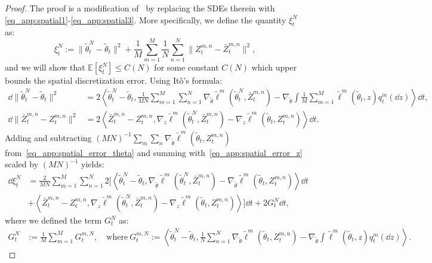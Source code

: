 \begin{proof}
    The proof is a modification of~\citet[Lemma 13]{caprioerrorboundsparticle2024} by replacing the SDEs therein with \eqref{eq_app:spatial1}-\eqref{eq_app:spatial3}. More specifically, we define the quantity $\xi^N_t$ as:
    \begin{equation}
        \xi_t^N := \|\tilde\theta_t^N - \tilde\theta_t\|^2 + \frac1M \sum_{m=1}^M \frac1N \sum_{n=1}^N \|Z_t^{m,n} - \bar{Z}_t^{m,n}\|^2,
    \end{equation}
    and we will show that $\mathbb{E}[\xi_t^N] \leq C(N)$ for some constant $C(N)$ which upper bounds the spatial discretization error. Using Itô's formula:
    \begin{align}
        \dd \|\tilde\theta_t^N - \tilde\theta_t\|^2 &= 2 \left\langle \tilde\theta_t^N - \tilde\theta_t, \frac{1}{MN} \sum_{m=1}^{M} \sum_{n=1}^N \nabla_{\tilde\theta} \tilde{\ell}^m(\tilde\theta_t^N, \bar{Z}_t^{m,n}) - \nabla_{\tilde\theta} \int \frac1M \sum_{m=1}^M \tilde{\ell}^m(\tilde\theta_t, z) q_t^m(\dd z) \right\rangle \dd t, \label{eq_app:spatial_error_theta}\\
        \dd \|\bar{Z}_t^{m,n} - {Z}_t^{m,n}\|^2 &= 2 \left\langle  
            \bar{Z}_t^{m,n} - {Z}_t^{m,n}, \nabla_z \tilde{\ell}^m(\tilde\theta_t^N, \bar{Z}_t^{m,n}) - \nabla_z \tilde{\ell}^m(\tilde\theta_t, Z_t^{m,n})
        \right\rangle \dd t.\label{eq_app:spatial_error_z}
    \end{align}
    Adding and subtracting $(MN)^{-1}\sum_m\sum_n\nabla_{\tilde\theta} \tilde{\ell}^m(\tilde\theta_t, Z_t^{m,n})$ from~\eqref{eq_app:spatial_error_theta} and summing with~\eqref{eq_app:spatial_error_z} scaled by $(MN)^{-1}$ yields:
    \begin{align*}
        \dd \xi_t^N &= \frac{2}{MN} \sum_{m=1}^M \sum_{n=1}^N 2\bigl[\left\langle \tilde\theta_t^N - \tilde\theta_t, \nabla_{\tilde\theta} \tilde{\ell}^m(\tilde\theta_t^N, \bar{Z}_t^{m,n}) - \nabla_{\tilde\theta} \tilde{\ell}^m(\tilde\theta_t, Z_t^{m,n}) 
        \right\rangle \dd t \\
        &+\left\langle \bar{Z}_t^{m,n} - {Z}_t^{m,n}, \nabla_z \tilde{\ell}^m(\tilde\theta_t^N, \bar{Z}_t^{m,n}) - \nabla_z \tilde{\ell}^m(\tilde\theta_t, Z_t^{m,n})\right\rangle
        \bigr] \dd t + 2 G_t^N \dd t,
    \end{align*}
    where we defined the term $G_t^N$ as:
    \begin{align*}
        G_t^N &:= \frac1M \sum_{m=1}^M G_t^{m,N}, \quad \text{where}\  G_t^{m,N} := \left\langle \tilde\theta_t^N - \tilde\theta_t, \frac1N \sum_{n=1}^{N} \nabla_{\tilde\theta} \tilde{\ell}^m(\tilde\theta_t, Z_t^{m,n}) - \nabla_{\tilde\theta} \int \tilde{\ell}^m(\tilde\theta_t, z) q_t^m(\dd z) \right\rangle.

\end{align*}
\end{proof}
